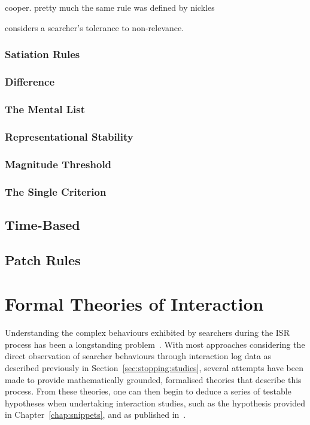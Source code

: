 ~\cite{cooper1973retrieval_effectiveness}

~\cite{cooper1973retrieval_effectiveness_ii}


cooper.
pretty much the same rule was defined by nickles

considers a searcher's tolerance to non-relevance.


\subsubsection{Satiation Rules}

\subsubsection{Difference}

\subsubsection{The Mental List}

\subsubsection{Representational Stability}

\subsubsection{Magnitude Threshold}

\subsubsection{The Single Criterion}

\subsection{Time-Based}

\subsection{Patch Rules}

\section{Formal Theories of Interaction}\label{sec:stopping:theories}
Understanding the complex behaviours exhibited by searchers during the ISR process has been a longstanding problem~\citep{azzopardi2015theories}. With most approaches considering the direct observation of searcher behaviours through interaction log data as described previously in Section~\ref{sec:stopping:studies}, several attempts have been made to provide mathematically grounded, formalised theories that describe this process. From these theories, one can then begin to deduce a series of testable hypotheses when undertaking interaction studies, such as the hypothesis provided in Chapter~\ref{chap:snippets}, and as published in~\cite{maxwell2017snippets}.

